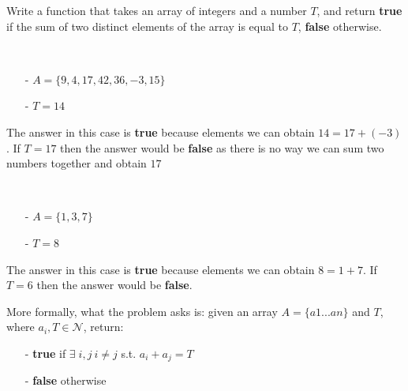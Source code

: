 \begin{exercise}
Write a function that takes an array of integers and a number $T$, and return \textbf{true} if the sum of two distinct elements of the array is equal to $T$, \textbf{false} otherwise.



\begin{example}
\hfill \\
	\begin{itemize}
		\item[-] 	$A=\{9, 4, 17, 42, 36, -3 ,15\}$
		\item[-] 	$T = 14$
	\end{itemize}
The answer in this case is \textbf{true} because elements we can obtain $14=17+ (-3)$. 
If $T=17$ then the answer would be \textbf{false} as there is no way we can sum two numbers together and obtain $17$
\end{example}

\begin{example}
\hfill \\
	\begin{itemize}
		\item[-] 	$A=\{1,3,7\}$
		\item[-] 	$T = 8$
	\end{itemize}
The answer in this case is \textbf{true} because elements we can obtain $8=1+7$. 
If $T=6$ then the answer would be \textbf{false}.
\end{example}


More formally, what the problem asks is: given an array $A=\{a1...an\}$ and $T$, where $a_i, T \in \mathcal{N}$, return:
	\begin{itemize}
		\item[-] \textbf{true }if $\exists \;i,j \: i \neq j$ s.t. $a_i+a_j = T$
		\item[-] \textbf{false} otherwise
	\end{itemize}
\end{exercise}	


